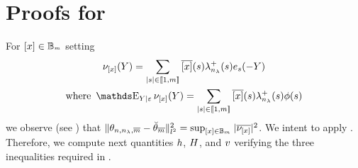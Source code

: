  \section{Proofs for }
 \begin{pro}\label{pro:cconc}
 For  $[x]\in{\mathbb B}_{^{_{m}}}$ setting
 \begin{multline*}
 \nu_{\He}(\rY)=\sum_{|s|\in\nset{1,\Di}}\ofHe{(s)}\hfedfmpI[(s)]\bas_s(-\rY) \\
 \text{where }\E_{\rY\vert\rE}\nu_{\He}(\rY)=\sum_{|s|\in\nset{1,\Di}}\ofHe{(s)}\hfedfmpI[(s)]\fydf[(s)]
 \end{multline*}
  we observe (see ) that
  $\lVert\theta_{n, n_{\lambda}, \overline{m}}-\breve{\theta}_{\overline{m}}\rVert_{l^{2}}^2=\sup_{[x]\in{\mathbb B}_{^{_{m}}}}|\overline{\nu_{[x]}}|^2$. We
  intent to apply . Therefore,  we compute  next quantities $h$, $H$,
 and $v$  verifying the three  inequalities required in
 .


\end{pro}
